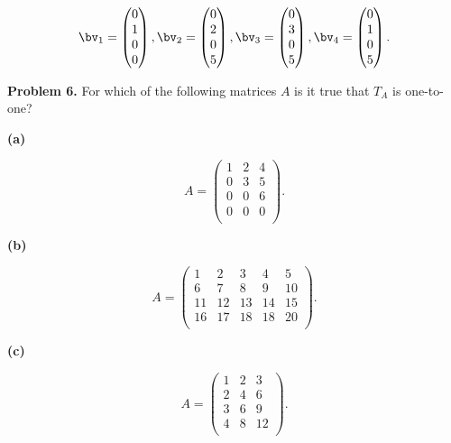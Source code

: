 \documentclass[oneside,12pt]{amsart}
\begin{document}
$$
\bv_1 =
\begin{pmatrix}
0 \\ 1 \\ 0 \\ 0
\end{pmatrix},
\bv_2 =
\begin{pmatrix}
0 \\ 2 \\ 0 \\ 5
\end{pmatrix},
\bv_3 =
\begin{pmatrix}
0 \\ 3 \\ 0 \\ 5
\end{pmatrix},
\bv_4 =
\begin{pmatrix}
0 \\ 1 \\ 0 \\ 5
\end{pmatrix}.
$$

\newpage

\textbf{Problem 6.} For which of the following matrices $A$ is it true that $T_A$ is one-to-one?


\textbf{(a)}

$$
A =
\begin{pmatrix}
1  &   2  &  4 \\
0  &   3  &  5  \\
0  &   0  &  6  \\
0  &   0  &  0  \\
\end{pmatrix}.
$$

\bigskip
\bigskip
\bigskip
\bigskip
\bigskip
\bigskip
\bigskip
\bigskip
\bigskip
\bigskip
\bigskip
\bigskip

\textbf{(b)}

$$
A =
\begin{pmatrix}
1  &  2 &  3 &  4  & 5 \\
6  &  7 &  8 &  9  & 10 \\
11 & 12 & 13 &  14 & 15 \\
16 & 17 & 18 &  18 & 20 \\
\end{pmatrix}.
$$

\bigskip
\bigskip
\bigskip
\bigskip
\bigskip
\bigskip
\bigskip
\bigskip
\bigskip
\bigskip
\bigskip
\bigskip

\textbf{(c)}

$$
A =
\begin{pmatrix}
1  &   2  &  3 \\
2  &   4  &  6  \\
3  &   6  &  9 \\
4  &   8  &  12  \\
\end{pmatrix}.
$$
\end{document}
